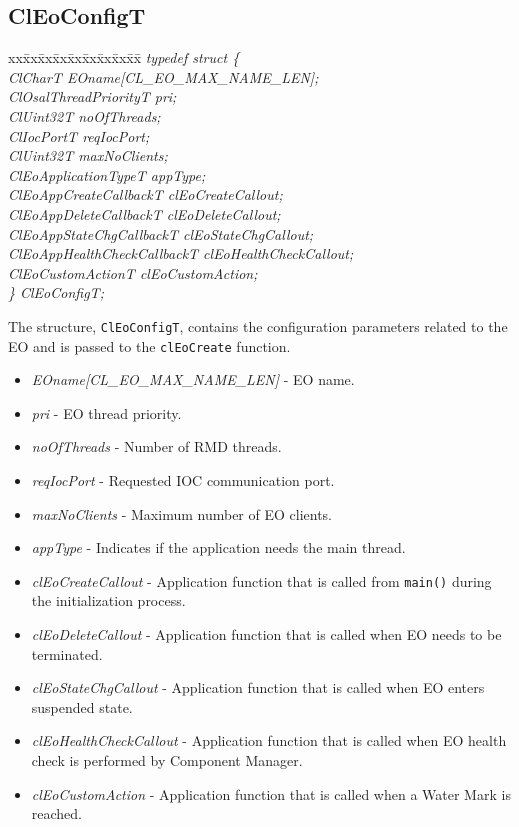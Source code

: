 \begin{flushleft}
\subsection{ClEoConfigT}
\begin{tabbing}
xx\=xx\=xx\=xx\=xx\=xx\=xx\=xx\=xx\=\kill
\textit{typedef struct \{}\\
\>\>\>\textit{ClCharT                EOname[CL\_EO\_MAX\_NAME\_LEN];}\\
\>\>\>\textit{ClOsalThreadPriorityT   pri;}\\
\>\>\>\textit{ClUint32T               noOfThreads;}\\
\>\>\>\textit{ClIocPortT              reqIocPort;}\\
\>\>\>\textit{ClUint32T               maxNoClients;}\\
\>\>\>\textit{ClEoApplicationTypeT    appType;}\\
\>\>\>\textit{ClEoAppCreateCallbackT  clEoCreateCallout;}\\
\>\>\>\textit{ClEoAppDeleteCallbackT  clEoDeleteCallout;}\\
\>\>\>\textit{ClEoAppStateChgCallbackT    clEoStateChgCallout;}\\
\>\>\>\textit{ClEoAppHealthCheckCallbackT clEoHealthCheckCallout;}\\
\>\>\>\textit{ClEoCustomActionT clEoCustomAction;}\\
\textit{\} ClEoConfigT;}\end{tabbing}
The structure, {\tt{ClEoConfigT}}, contains the configuration parameters related to the EO and is passed to the {\tt{clEoCreate}} function.
\begin{itemize}
 \item
 \textit{EOname[CL\_\-EO\_\-MAX\_\-NAME\_\-LEN]} - EO name.
 \item
 \textit{pri} - EO thread priority.
 \item
 \textit{noOfThreads} - Number of RMD threads.
 \item
 \textit{reqIocPort} - Requested IOC communication port.
 \item
 \textit{maxNoClients} - Maximum number of EO clients.
  \item
 \textit{appType} - Indicates if the application needs the main thread.
 \item
 \textit{clEoCreateCallout} - Application function that is called from {\tt{main()}} during the
 initialization process.
\item
\textit{clEoDeleteCallout} - Application function that is called when EO needs to be terminated.
\item
\textit{clEoStateChgCallout} - Application function that is called when EO enters suspended state.
\item
\textit{clEoHealthCheckCallout} - Application function that is called when EO health check is
performed by Component Manager.
\item
\textit{clEoCustomAction} - Application function that is called when a Water Mark is reached.
\end{itemize}



\end{flushleft}
